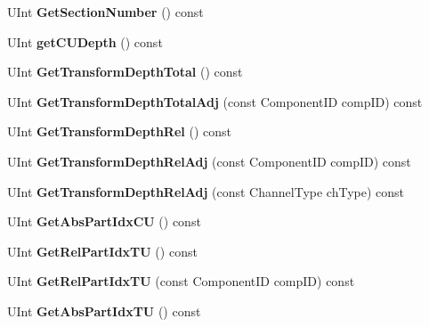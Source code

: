 \begin{DoxyCompactItemize}
U\+Int {\bfseries Get\+Section\+Number} () const
\item 
\mbox{\label{class_t_com_t_u_a96722af90802c25f574461c6e7fb8994}} 
U\+Int {\bfseries get\+C\+U\+Depth} () const
\item 
\mbox{\label{class_t_com_t_u_a9e6f6d4fef3c7993ba519bba39c63f3a}} 
U\+Int {\bfseries Get\+Transform\+Depth\+Total} () const
\item 
\mbox{\label{class_t_com_t_u_a65a4e9b6e5193082b36e8ea927e896a3}} 
U\+Int {\bfseries Get\+Transform\+Depth\+Total\+Adj} (const Component\+ID comp\+ID) const
\item 
\mbox{\label{class_t_com_t_u_adbba4af2d7e7a8cd09175dcd04e901f2}} 
U\+Int {\bfseries Get\+Transform\+Depth\+Rel} () const
\item 
\mbox{\label{class_t_com_t_u_ab68b5cde1c3992eac5a6f5f495ec8adc}} 
U\+Int {\bfseries Get\+Transform\+Depth\+Rel\+Adj} (const Component\+ID comp\+ID) const
\item 
\mbox{\label{class_t_com_t_u_a52e7657e0a4a1359505a17b7ece98a0c}} 
U\+Int {\bfseries Get\+Transform\+Depth\+Rel\+Adj} (const Channel\+Type ch\+Type) const
\item 
\mbox{\label{class_t_com_t_u_ac571da5806605306bd1159ff420798b8}} 
U\+Int {\bfseries Get\+Abs\+Part\+Idx\+CU} () const
\item 
\mbox{\label{class_t_com_t_u_a65067ed61f8bf788271a204b34c4dbde}} 
U\+Int {\bfseries Get\+Rel\+Part\+Idx\+TU} () const
\item 
\mbox{\label{class_t_com_t_u_aba140b688d019bc11c0d380c93130c49}} 
U\+Int {\bfseries Get\+Rel\+Part\+Idx\+TU} (const Component\+ID comp\+ID) const
\item 
\mbox{\label{class_t_com_t_u_ac39f11c49e9381cee5834f4cf0590eb3}} 
U\+Int {\bfseries Get\+Abs\+Part\+Idx\+TU} () const
\item 
\mbox{\label{class_t_com_t_u_ad2d42747423c8844f8551c34af0918e5}} 

\end{DoxyCompactItemize}
